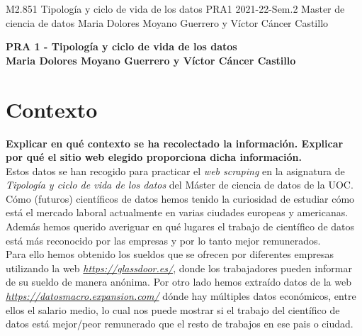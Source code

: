 \documentclass[IB]{PlantillaPACnova_Est}
\begin{document}
\textinicial
{M2.851} 				
{Tipología y ciclo de vida de los datos}
{PRA1}
{2021-22-Sem.2}
{Master de ciencia de datos}
{Maria Dolores Moyano Guerrero y Víctor Cáncer Castillo}




\begin{center}
\textbf{{\LARGE PRA 1 - Tipología y ciclo de vida de los datos}}\\[1cm]

\textbf{{\Large Maria Dolores Moyano Guerrero y Víctor Cáncer Castillo}}
\end{center}

\tableofcontents
\newpage 

\section{Contexto}

\textbf{Explicar en qué contexto se ha recolectado la información. Explicar por qué el sitio web elegido proporciona dicha información.}  \\

Estos datos se han recogido para practicar el \textit{web scraping} en la asignatura de \textit{Tipología y ciclo de vida de los datos} del Máster de ciencia de datos de la UOC.\\

Cómo (futuros) científicos de datos hemos tenido la curiosidad de estudiar cómo está el mercado laboral actualmente en varias ciudades europeas y americanas. Además hemos querido averiguar en qué lugares el trabajo de científico de datos está más reconocido por las empresas y por lo tanto mejor remunerados. \\

Para ello hemos obtenido los sueldos que se ofrecen por diferentes empresas utilizando la web \textit{\url{https://glassdoor.es/}}, donde los trabajadores pueden informar de su sueldo de manera anónima. Por otro lado hemos extraído datos de la web \textit{ \url{https://datosmacro.expansion.com/}} dónde hay múltiples datos económicos, entre ellos el salario medio, lo cual nos puede mostrar si el trabajo del científico de datos está mejor/peor remunerado que el resto de trabajos en ese pais o ciudad.
\end{document}
